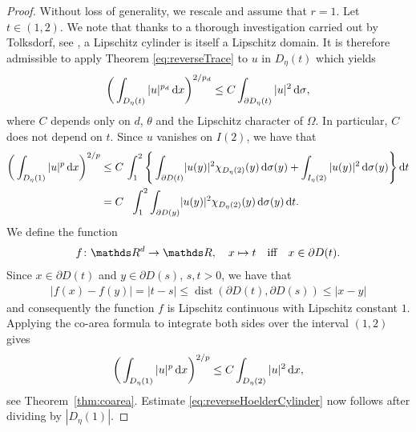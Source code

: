 \begin{proof}
  Without loss of generality, we rescale and assume that $r = 1$.
  Let $t \in (1,2)$. 
  We note that thanks to a thorough investigation carried out by Tolksdorf, see \cite[Lemma 1.3.25]{tolksdorf}, a Lipschitz cylinder is itself a Lipschitz domain.
  It is therefore admissible to apply Theorem \ref{eq:reverseTrace} to $u$ in $D_\eta(t)$ which yields
  \begin{align*}
    \bigg( \int_{D_\eta(t)} |u|^{p_d} \, {\operatorname{d}\!{x}} \bigg)^{2/p_d} \leq C \int_{\partial D_\eta(t)} |u|^2 \, {\operatorname{d}\!{\sigma}},
  \end{align*}
  where $C$ depends only on $d$, $\theta$ and the Lipschitz character of $\Omega$. In particular, $C$ does not depend on $t$.
  Since $u$ vanishes on $I(2)$, we have that
  \begin{align*}
    \bigg( \int_{D_\eta(1)} |u|^p \d x \bigg)^{2/p} 
    &\leq C\, \int_1^2 \Bigg\{  \int_{\partial D(t)} \! |u(y)|^2 \chi_{D_\eta(2)}(y) \d\sigma(y) +  \int_{I_\eta(2)} |u(y)|^2 \d \sigma(y) \Bigg\} \d t  \\
    &= C \hphantom{\Big\{} \int_1^2 \int_{\partial D(y)} \! |u(y)|^2 \chi_{D_\eta(2)}(y) \d\sigma(y) \d t.
  \end{align*}
  We define the function
  \begin{align*}
    f \colon \R^d \to \R, \quad x \mapsto t \quad\text{iff}\quad x \in \partial D(t).
  \end{align*}
  Since $x \in \partial D(t)$ and $y \in \partial D(s)$, $s,t > 0$, we have that
  \begin{align*}
    |f(x) - f(y)| = |t - s| \leq \operatorname{dist}(\partial D(t), \partial D(s)) \leq |x- y|
  \end{align*}
  and consequently the function $f$ is Lipschitz continuous with Lipschitz constant $1$.
  Applying the co-area formula to integrate both sides over the interval $(1,2)$ gives
  \begin{align*}
    \bigg( \int_{D_\eta(1)} |u|^p \, {\operatorname{d}\!{x}} \bigg)^{2/p} \leq C \int_{D_\eta(2)} |u|^2 \, {\operatorname{d}\!{x}},
  \end{align*}
  see Theorem~\ref{thm:coarea}.
  Estimate \eqref{eq:reverseHoelderCylinder} now follows after dividing by $|D_\eta(1)|$.
\end{proof}


